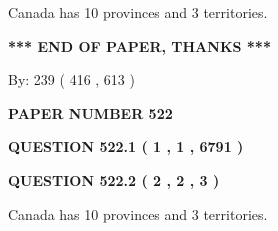 \documentclass[12pt]{article}
\begin{document}
  
 
 
\noindent{}
 
 
Canada has 10  provinces and 3 territories.
 
 
 
 
   
   
 \vspace{0.2in}
 
   
   
   
   
\vspace{1.0in} 
{\textbf{\large{ *** END OF PAPER, THANKS *** }}} 
   
   
\hspace{1.0in} By: 
 239 ( 416 ,  613 )
   
   
   
   
\newpage 
\setcounter{page}{ 
   522001 } 
   
   
   
   
 {\textbf{ \Large{ PAPER NUMBER  522  }}}
   
   
\vspace{0.2in}
   
   
   
   
   
   
 \vspace{0.2in}
 
 
 
 
   
   
  
\vspace{0.2in}
  
{\textbf{\Large{QUESTION
522.1 
 ( 1 , 1 , 6791 )
}}}
  
  
  
\vspace{0.2in}
  
{\textbf{\Large{QUESTION
522.2 
 ( 2 , 2 , 3 )
}}}
  
  
 
 
\noindent{}
 
 
Canada has 10  provinces and 3 territories.
 
 
 
 
   
   
 \vspace{0.2in}
 
\end{document}
